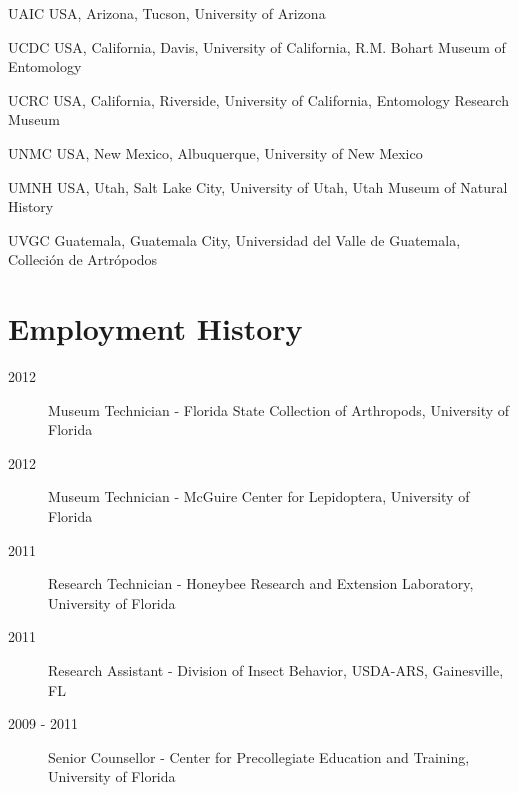 \documentclass[12pt,a4paper]{article}
\begin{document}
\begin{collections}
			\item [UAIC] USA, Arizona, Tucson, University of Arizona
			\item [UCDC] USA, California, Davis, University of California, R.M. Bohart Museum of Entomology
			\item [UCRC] USA, California, Riverside, University of California, Entomology Research Museum
			\item [UNMC] USA, New Mexico, Albuquerque, University of New Mexico
			\item [UMNH] USA, Utah, Salt Lake City, University of Utah, Utah Museum of Natural History
			\item [UVGC] Guatemala, Guatemala City, Universidad del Valle de Guatemala, Colleci\'{o}n de Artr\'{o}podos
		\end{collections}

\section*{Employment History}
	\begin{description}
		\item [2012] Museum Technician - Florida State Collection of Arthropods, University of Florida
		\item [2012] Museum Technician - McGuire Center for Lepidoptera, University of Florida
		\item [2011] Research Technician - Honeybee Research and Extension Laboratory, University of Florida
		\item [2011] Research Assistant - Division of Insect Behavior, USDA-ARS, Gainesville, FL
		\item [2009 - 2011] Senior Counsellor - Center for Precollegiate Education and Training, University of Florida
	\end{description}
\end{document}
